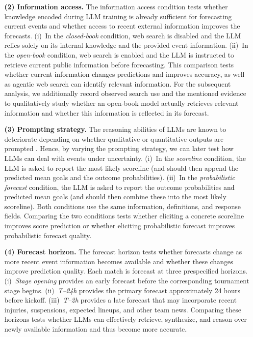 \documentclass[sigconf,nonacm]{acmart}
\begin{document}
\textbf{(2) Information access.}
The information access condition tests whether knowledge encoded during LLM training is already sufficient for forecasting current events and whether access to recent external information improves the forecasts. (i)~In the \emph{closed-book} condition, web search is disabled and the LLM relies solely on its internal knowledge and the provided event information. (ii)~In the \emph{open-book} condition, web search is enabled and the LLM is instructed to retrieve current public information before forecasting. This comparison tests whether current information changes predictions and improves accuracy, as well as agentic web search can identify relevant information. For the subsequent analysis, we additionally record observed search use and the mentioned evidence to qualitatively study whether an open-book model actually retrieves relevant information and whether this information is reflected in its forecast.

\textbf{(3) Prompting strategy.}
The reasoning abilities of LLMs are known to deteriorate depending on whether qualitative or quantitative outputs are prompted \cite{atrejaWhatsPromptLargeScale2025}. Hence, by varying the prompting strategy, we can later test how LLMs can deal with events under uncertainty. (i)~In the \emph{scoreline} condition, the LLM is asked to report the most likely scoreline (and should then append the predicted mean goals and the outcome probabilities). (ii)~In the \emph{probabilistic forecast} condition, the LLM is asked to report the outcome probabilities and predicted mean goals (and should then combine these into the most likely scoreline). Both conditions use the same information, definitions, and response fields. Comparing the two conditions tests whether eliciting a concrete scoreline improves score prediction or whether eliciting probabilistic forecast improves probabilistic forecast quality.

\textbf{(4) Forecast horizon.}
The forecast horizon tests whether forecasts change as more recent event information becomes available and whether these changes improve prediction quality. Each match is forecast at three prespecified horizons. (i)~\emph{Stage opening} provides an early forecast before the corresponding tournament stage begins. (ii)~\emph{T--24h} provides the primary forecast approximately 24 hours before kickoff. (iii)~\emph{T--2h} provides a late forecast that may incorporate recent injuries, suspensions, expected lineups, and other team news. Comparing these horizons tests whether LLMs can effectively retrieve, synthesize, and reason over newly available information and thus become more accurate. 
\end{document}
